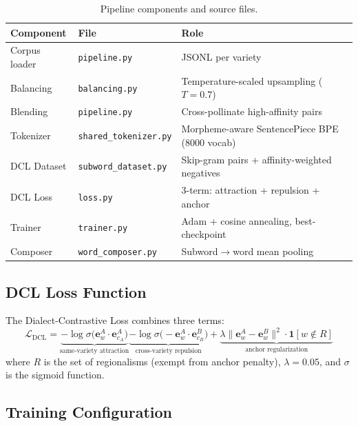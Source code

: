 \documentclass[11pt,a4paper]{article}
\begin{document}
\begin{table}[H]
\centering\small
\begin{tabular}{@{}lll@{}}
\toprule
\textbf{Component} & \textbf{File} & \textbf{Role} \\
\midrule
Corpus loader & \texttt{pipeline.py} & JSONL per variety \\
Balancing & \texttt{balancing.py} & Temperature-scaled upsampling ($T{=}0.7$) \\
Blending & \texttt{pipeline.py} & Cross-pollinate high-affinity pairs \\
Tokenizer & \texttt{shared\_tokenizer.py} & Morpheme-aware SentencePiece BPE (8000 vocab) \\
DCL Dataset & \texttt{subword\_dataset.py} & Skip-gram pairs + affinity-weighted negatives \\
DCL Loss & \texttt{loss.py} & 3-term: attraction + repulsion + anchor \\
Trainer & \texttt{trainer.py} & Adam + cosine annealing, best-checkpoint \\
Composer & \texttt{word\_composer.py} & Subword$\to$word mean pooling \\
\bottomrule
\end{tabular}
\caption{Pipeline components and source files.}
\end{table}

\subsection{DCL Loss Function}

The Dialect-Contrastive Loss combines three terms:
\begin{equation}
\mathcal{L}_{\text{DCL}} =
  \underbrace{-\log\sigma\!\bigl(\mathbf{e}_w^A \cdot \mathbf{e}_{c_A}^A\bigr)}_{\text{same-variety attraction}}
  \underbrace{-\log\sigma\!\bigl(-\mathbf{e}_w^A \cdot \mathbf{e}_{c_B}^B\bigr)}_{\text{cross-variety repulsion}}
  + \underbrace{\lambda \|\mathbf{e}_w^A - \mathbf{e}_w^B\|^2 \cdot \mathbf{1}[w \notin R]}_{\text{anchor regularization}}
\label{eq:dcl}
\end{equation}
where $R$ is the set of regionalisms (exempt from anchor penalty), $\lambda = 0.05$, and $\sigma$ is the sigmoid function.

\subsection{Training Configuration}
\end{document}
